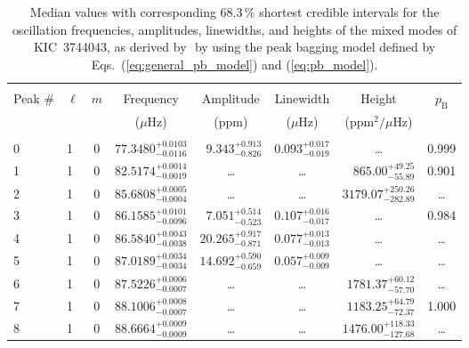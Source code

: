\begin{table*}[!]
\caption{Median values with corresponding 68.3\,\% shortest credible intervals for the oscillation frequencies, amplitudes, linewidths, and heights of the mixed modes of KIC~3744043, as derived by \diamonds\,\,by using the peak bagging model defined by Eqs.~(\ref{eq:general_pb_model}) and (\ref{eq:pb_model}).}
\label{tab:3744043m}
\centering
\begin{tabular}{llcrrlrc}
\hline\hline
\\[-8pt]          
Peak \# & $\ell$ & $m$ & \multicolumn{1}{c}{Frequency} & \multicolumn{1}{c}{Amplitude} & \multicolumn{1}{c}{Linewidth} & \multicolumn{1}{c}{Height}& $p_\mathrm{B}$\\
 & & & \multicolumn{1}{c}{($\mu$Hz)} & \multicolumn{1}{c}{(ppm)} & \multicolumn{1}{c}{($\mu$Hz)} & \multicolumn{1}{c}{(ppm$^2/\mu$Hz)}\\
\hline \\[-8pt]
0 & 1 & 0 & $     77.3480_{-      0.0116}^{+      0.0103}$ & $       9.343_{-       0.826}^{+       0.913}$ & $       0.093_{-       0.019}^{+       0.017}$ & \multicolumn{1}{c}{\dots} & 0.999\\[1pt]

1  & 1 & 0 & $     82.5174_{-      0.0019}^{+      0.0014}$ & \multicolumn{1}{c}{\dots} & \multicolumn{1}{c}{\dots} & $      865.00_{-       55.89}^{+       49.25}$ & 0.901 \\[1pt]
2 & 1 & 0 & $     85.6808_{-      0.0004}^{+      0.0005}$ & \multicolumn{1}{c}{\dots} & \multicolumn{1}{c}{\dots} & $     3179.07_{-      282.89}^{+      250.26}$ & \dots \\[1pt]
3 & 1 & 0 & $     86.1585_{-      0.0096}^{+      0.0101}$ & $       7.051_{-       0.523}^{+       0.514}$ & $       0.107_{-       0.017}^{+       0.016}$ & \multicolumn{1}{c}{\dots} & 0.984\\[1pt]
4 & 1 & 0 & $     86.5840_{-      0.0038}^{+      0.0043}$ & $      20.265_{-       0.871}^{+       0.917}$ & $       0.077_{-       0.013}^{+       0.013}$ & \multicolumn{1}{c}{\dots} &\dots \\[1pt]
5 & 1 & 0 & $     87.0189_{-      0.0034}^{+      0.0034}$ & $      14.692_{-       0.659}^{+       0.590}$ & $       0.057_{-       0.009}^{+       0.009}$ & \multicolumn{1}{c}{\dots} & \dots\\[1pt]
6 & 1 & 0 & $     87.5226_{-      0.0007}^{+      0.0006}$ & \multicolumn{1}{c}{\dots} & \multicolumn{1}{c}{\dots} & $     1781.37_{-       57.70}^{+       60.12}$ & \dots \\[1pt]
7 & 1 & 0 & $     88.1006_{-      0.0007}^{+      0.0008}$ & \multicolumn{1}{c}{\dots} & \multicolumn{1}{c}{\dots} & $     1183.25_{-       72.37}^{+       64.79}$ & 1.000\\[1pt]
8 & 1 & 0 & $     88.6664_{-      0.0009}^{+      0.0009}$ & \multicolumn{1}{c}{\dots} & \multicolumn{1}{c}{\dots} & $     1476.00_{-      127.68}^{+      118.33}$ & \dots\\[1pt]


\end{tabular}
\end{table*}
